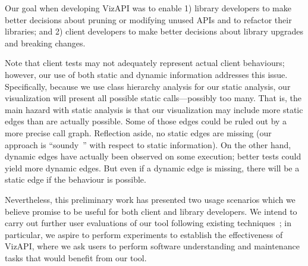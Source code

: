 \label{sec:discussion}
Our goal when developing VizAPI was to enable 1) library developers to make better
decisions about pruning or modifying unused APIs and to refactor their
libraries; and 2) client developers to make better decisions about library
upgrades and breaking changes.


Note that client tests may
not adequately represent actual client behaviours; however, our use of both static
and dynamic information addresses this issue. Specifically, because we use
class hierarchy analysis for our static analysis, our visualization will present
all possible static calls---possibly too many. 
That is, the main hazard with static analysis is that our visualization may include more
static edges than are actually possible. Some of those edges could be ruled out by a more
precise call graph. Reflection aside, no static edges
are missing (our approach is ``soundy~\cite{livshits15:_in_defen_sound}'' with respect to static information). On the other hand, dynamic edges have actually been observed
on some execution; better tests could yield more dynamic edges. But even if
a dynamic edge is missing, there will be a static edge if the behaviour is possible.

Nevertheless, this preliminary work has presented two usage scenarios which we
believe promise to be useful for both client and library
developers. We intend to carry out further user evaluations of our tool following
existing techniques~\cite{merino18:_system_liter_review_softw_visual_evaluat}; in
particular, we aspire to perform experiments to establish the
effectiveness of VizAPI, where we ask users to perform software
understanding and maintenance tasks that would benefit from our tool.


